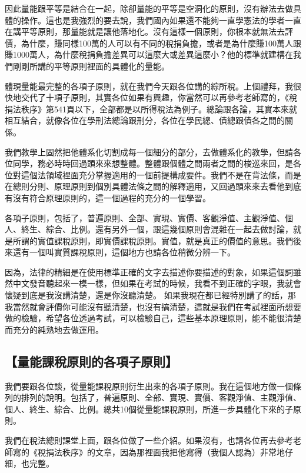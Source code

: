 \documentclass[oneside,sub3section]{ctexbook}
\begin{document}
因此量能跟平等是結合在一起，除卻量能的平等是空洞化的原則，沒有辦法去做具體的操作。這也是我強烈的要去說，我們國內如果還不能夠一直學憲法的學者一直在講平等原則，那量能就是讓他落地化。沒有這樣一個原則，你根本就無法去評價，為什麼，賺同樣100萬的人可以有不同的稅捐負擔，或者是為什麼賺100萬人跟賺1000萬人，為什麼稅捐負擔差異可以這麼大或差異這麼小？他的標準就建構在我們剛剛所講的平等原則裡面的具體化的量能。

體現量能最完整的各項子原則，就在我們今天跟各位講的綜所稅。上個禮拜，我很快地交代了十項子原則，其實各位如果有興趣，你當然可以再參考老師寫的，《稅捐法秩序》第541頁以下，全部都是以所得稅法為例子。總論跟各論，其實本來就相互結合，就像各位在學刑法總論跟刑分，各位在學民總、債總跟債各之間的關係。

我們教學上固然把他體系化切割成每一個細分的部分，去做體系化的教學，但請各位同學，務必時時回過頭來來想整體。整體跟個體之間兩者之間的梭巡來回，是各位對這個法領域裡面充分掌握適用的一個前提構成要件。我們不是在背法條，而是在總則分則、原理原則到個別具體法條之間的解釋適用，又回過頭來來去看他到底有沒有符合原理原則的，這一個過程的充分的一個學習。

各項子原則，包括了，普遍原則、全部、實現、實價、客觀淨值、主觀淨值、個人、終生、綜合、比例。還有另外一個，跟這幾個原則會混雜在一起去做討論，就是所謂的實值課稅原則，即實價課稅原則。實值，就是真正的價值的意思。我們後來還有一個叫實質課稅原則，這個地方也請各位稍微分辨一下。

因為，法律的精細是在使用標準正確的文字去描述你要描述的對象，如果這個詞雖然中文發音聽起來一模一樣，但如果在考試的時候，我看不到正確的字眼，我就會懷疑到底是我沒講清楚，還是你沒聽清楚。
如果我現在都已經特別講了的話，那我當然就會評價你可能沒有聽清楚，也沒有搞清楚，這就是我們在考試裡面所想要做的檢驗，希望各位透過考試，可以檢驗自己，這些基本原理原則，能不能很清楚而充分的純熟地去做運用。

\hypertarget{ux91cfux80fdux8ab2ux7a05ux539fux5247ux7684ux5404ux9805ux5b50ux539fux5247}{%
\subsection{【量能課稅原則的各項子原則】}\label{ux91cfux80fdux8ab2ux7a05ux539fux5247ux7684ux5404ux9805ux5b50ux539fux5247}}

我們要跟各位談，從量能課稅原則衍生出來的各項子原則。我在這個地方做一個條列的排列的說明。包括了，普遍原則、全部、實現、實價、客觀淨值、主觀淨值、個人、終生、綜合、比例。總共10個從量能課稅原則，所進一步具體化下來的子原則。

我們在稅法總則課堂上面，跟各位做了一些介紹。如果沒有，也請各位再去參考老師寫的《稅捐法秩序》的文章，因為那裡面我把他寫得（我個人認為）非常地仔細，也完整。
\end{document}
